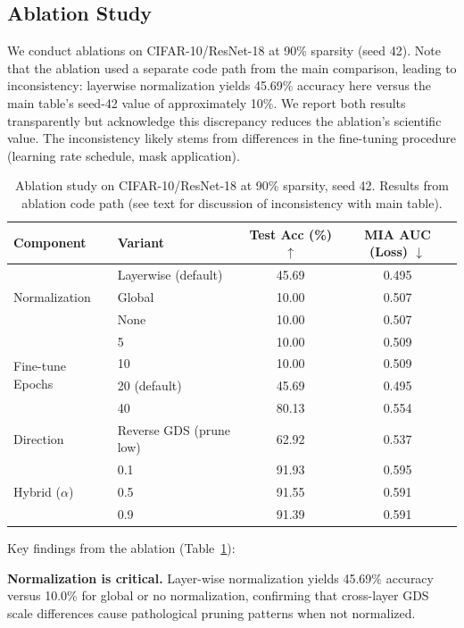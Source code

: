 \documentclass{article}
\begin{document}
\subsection{Ablation Study}

We conduct ablations on CIFAR-10/ResNet-18 at 90\% sparsity (seed 42). Note that the ablation used a separate code path from the main comparison, leading to inconsistency: layerwise normalization yields 45.69\% accuracy here versus the main table's seed-42 value of approximately 10\%. We report both results transparently but acknowledge this discrepancy reduces the ablation's scientific value. The inconsistency likely stems from differences in the fine-tuning procedure (learning rate schedule, mask application).

\begin{table}[t]
\caption{Ablation study on CIFAR-10/ResNet-18 at 90\% sparsity, seed 42. Results from ablation code path (see text for discussion of inconsistency with main table).}
\label{tab:ablation}
\centering
\small
\begin{tabular}{llcc}
\toprule
Component & Variant & Test Acc (\%) $\uparrow$ & MIA AUC (Loss) $\downarrow$ \\
\midrule
\multirow{3}{*}{Normalization} & Layerwise (default) & 45.69 & 0.495 \\
& Global & 10.00 & 0.507 \\
& None & 10.00 & 0.507 \\
\midrule
\multirow{4}{*}{Fine-tune Epochs} & 5 & 10.00 & 0.509 \\
& 10 & 10.00 & 0.509 \\
& 20 (default) & 45.69 & 0.495 \\
& 40 & 80.13 & 0.554 \\
\midrule
Direction & Reverse GDS (prune low) & 62.92 & 0.537 \\
\midrule
\multirow{3}{*}{Hybrid ($\alpha$)} & 0.1 & 91.93 & 0.595 \\
& 0.5 & 91.55 & 0.591 \\
& 0.9 & 91.39 & 0.591 \\
\bottomrule
\end{tabular}
\end{table}

Key findings from the ablation (Table~\ref{tab:ablation}):

\textbf{Normalization is critical.} Layer-wise normalization yields 45.69\% accuracy versus 10.0\% for global or no normalization, confirming that cross-layer GDS scale differences cause pathological pruning patterns when not normalized.
\end{document}
